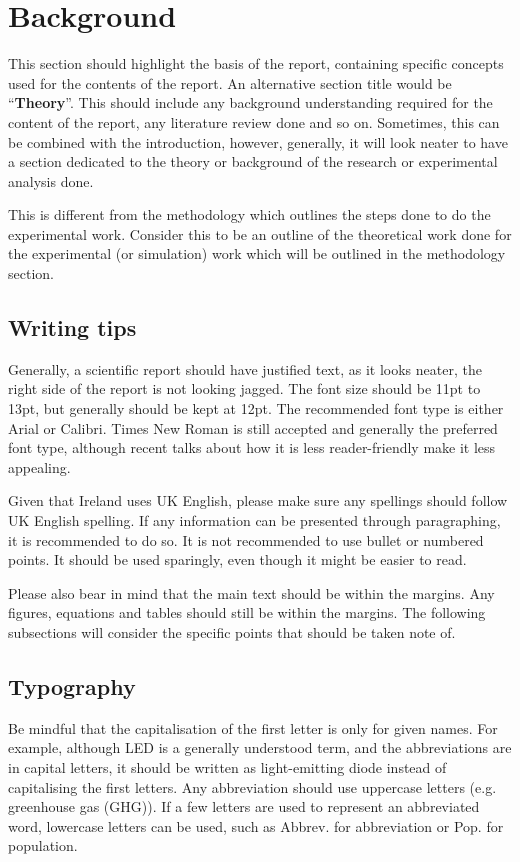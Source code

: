 \section{Background}
This section should highlight the basis of the report, containing specific concepts used for the contents of the report. An alternative section title would be ``\textbf{Theory}''. This should include any background understanding required for the content of the report, any literature review done and so on. Sometimes, this can be combined with the introduction, however, generally, it will look neater to have a section dedicated to the theory or background of the research or experimental analysis done. 

This is different from the methodology which outlines the steps done to do the experimental work. Consider this to be an outline of the theoretical work done for the experimental (or simulation) work which will be outlined in the methodology section. 

\subsection{Writing tips}
Generally, a scientific report should have justified text, as it looks neater, the right side of the report is not looking jagged. The font size should be 11pt to 13pt, but generally should be kept at 12pt. The recommended font type is either Arial or Calibri. Times New Roman is still accepted and generally the preferred font type, although recent talks about how it is less reader-friendly make it less appealing. 

Given that Ireland uses UK English, please make sure any spellings should follow UK English spelling. If any information can be presented through paragraphing, it is recommended to do so. It is not recommended to use bullet or numbered points. It should be used sparingly, even though it might be easier to read. 

Please also bear in mind that the main text should be within the margins. Any figures, equations and tables should still be within the margins. The following subsections will consider the specific points that should be taken note of.

\subsection{Typography}
Be mindful that the capitalisation of the first letter is only for given names. For example, although LED is a generally understood term, and the abbreviations are in capital letters, it should be written as light-emitting diode instead of capitalising the first letters. Any abbreviation should use uppercase letters (e.g. greenhouse gas (GHG)). If a few letters are used to represent an abbreviated word, lowercase letters can be used, such as Abbrev. for abbreviation or Pop. for population. 

